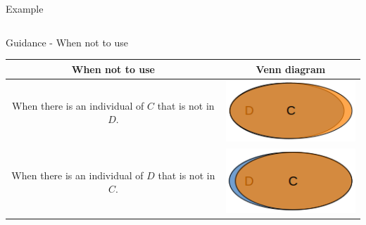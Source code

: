 \documentclass{beamer}
\begin{document}
{\begin{block}{Example}
\begin{table}
\begin{center}
\begin{small}
\begin{tabular}{|c|c|c|}
						\hline						 				  
					\end{tabular}
				\end{small}
			\end{center}
		\end{table}
	\end{block}
	\begin{block}{Guidance - When not to use}
		\begin{table} 
			\begin{center} 
				\begin{small}
					\begin{tabular}{|c|c|} 
						\hline					
						\textbf{When not to use}&\textbf{Venn diagram}\\
						\hline 
						\begin{minipage}{7.5cm}
							When there is an individual of $C$ that is not in $D$.
						\end{minipage}									
						& 
						\begin{minipage}{3cm}
							\includegraphics[trim = 0mm 0mm 0mm 0mm, clip, scale=0.4]{./images/IndividualOfCnotInD.png}
						\end{minipage}										
						\\
						\hline 
						\begin{minipage}{7.5cm}
							When there is an individual of $D$ that is not in $C$.
						\end{minipage}									
						& 
						\begin{minipage}{3cm}
							\includegraphics[trim = 0mm 1mm 0mm 1mm, clip, scale=0.4]{./images/IndividualOfDnotInC.png}
						\end{minipage}										
						\\					
						\hline						 				  
					\end{tabular}
				\end{small}
			\end{center}
		\end{table}
	\end{block}
}
\end{document}
